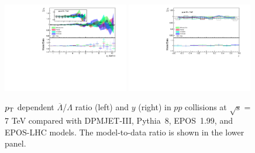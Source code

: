 \documentclass{article}
\newcommand{\sqrts}{\mbox{$\sqrt{\mathrm{s}}$}}
\newcommand{\alam}{$\overline{\Lambda}$}
\newcommand{\lam}{$\Lambda$}
\newcommand{\ppt}{$p_{\rm T}$}
\begin{document}
\begin{figure}[!ht]
\centering
\includegraphics[width=0.49\textwidth,height=0.35\textheight]{lalam_pt_7000.pdf}
\includegraphics[width=0.49\textwidth,height=0.35\textheight]{lalam_eta_7000.pdf}

\caption{{\ppt} dependent {\alam /\lam} ratio (left) and $y$ (right) in $pp$ collisions at {\sqrts} = 7 TeV compared with DPMJET-III, Pythia~8, EPOS~1.99, and EPOS-LHC models. The model-to-data ratio is shown in the lower panel.}
\label{fig5}
\end{figure}
\end{document}
